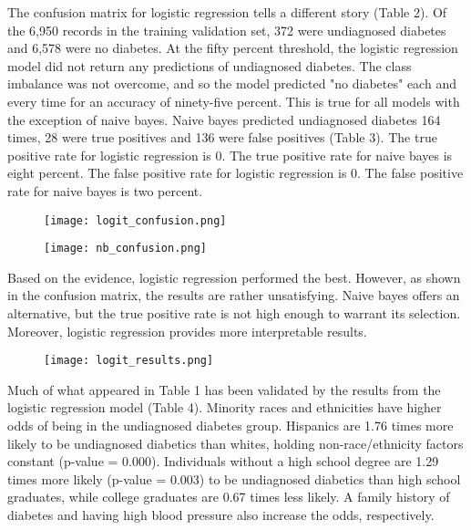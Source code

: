 \documentclass[twoside,11pt]{article}
\begin{document}
The confusion matrix for logistic regression tells a different story (Table 2). Of the 6,950 records in the training validation set, 372 were undiagnosed diabetes and 6,578 were no diabetes. At the fifty percent threshold, the logistic regression model did not return any predictions of undiagnosed diabetes. The class imbalance was not overcome, and so the model predicted "no diabetes" each and every time for an accuracy of ninety-five percent. This is true for all models with the exception of naive bayes. Naive bayes predicted undiagnosed diabetes 164 times, 28 were true positives and 136 were false positives (Table 3). The true positive rate for logistic regression is 0. The true positive rate for naive bayes is eight percent. The false positive rate for logistic regression is 0. The false positive rate for naive bayes is two percent. 

\begin{figure}[htbp]
  \centering 
  \texttt{[image: logit\_confusion.png]} 
  \label{fig:4} 
\end{figure} 

\begin{figure}[htbp]
  \centering 
  \texttt{[image: nb\_confusion.png]} 
  \label{fig:5} 
\end{figure} 

Based on the evidence, logistic regression performed the best. However, as shown in the confusion matrix, the results are rather unsatisfying. Naive bayes offers an alternative, but the true positive rate is not high enough to warrant its selection. Moreover, logistic regression provides more interpretable results. 

\begin{figure}[htbp]
  \centering 
  \texttt{[image: logit\_results.png]} 
  \label{fig:6} 
\end{figure} 

Much of what appeared in Table 1 has been validated by the results from the logistic regression model (Table 4). Minority races and ethnicities have higher odds of being in the undiagnosed diabetes group. Hispanics are 1.76 times more likely to be undiagnosed diabetics than whites, holding non-race/ethnicity factors constant (p-value = 0.000). Individuals without a high school degree are 1.29 times more likely (p-value = 0.003) to be undiagnosed diabetics than high school graduates, while college graduates are 0.67 times less likely. A family history of diabetes and having high blood pressure also increase the odds, respectively. 
\end{document}
